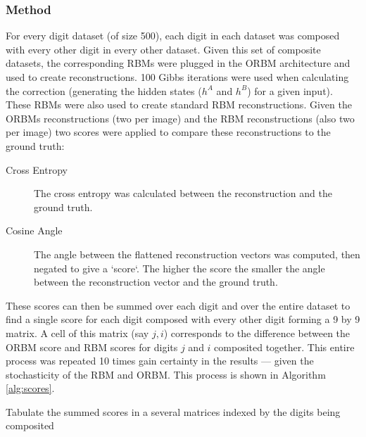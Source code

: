     \subsubsection{Method}

    For every digit dataset (of size 500), each digit in each dataset was composed with every other digit in every other dataset. Given this set of composite datasets, the corresponding RBMs were plugged in the ORBM architecture and used to create reconstructions. 100 Gibbs iterations were used when calculating the correction (generating the hidden states ($h^A$ and $h^B$) for a given input). These RBMs were also used to create standard RBM reconstructions.
    Given the ORBMs reconstructions (two per image) and the RBM reconstructions (also two per image) two scores were applied to compare these reconstructions to the ground truth:
    \begin{description}
      \item[Cross Entropy] The cross entropy was calculated between the reconstruction and the ground truth.
      \item[Cosine Angle] The angle between the flattened reconstruction vectors was computed, then negated to give a `score`. The higher the score the smaller the angle between the reconstruction vector and the ground truth.
    \end{description}
    These scores can then be summed over each digit and over the entire dataset to find a single score for each digit composed with every other digit forming a 9 by 9 matrix. A cell of this matrix (say $j,i$) corresponds to the difference between the ORBM score and RBM scores for digits $j$ and $i$ composited together. This entire process was repeated 10 times gain certainty in the results --- given the stochasticity of the RBM and ORBM. This process is shown in Algorithm \ref{alg:scores}.

    \begin{algorithm}[!ht]

      {
       Tabulate the summed scores in a several matrices indexed by the digits being composited\;
     }
    \caption{The algorithm explaining how the scores matrices were computed.}\label{alg:scores}
    \end{algorithm}

